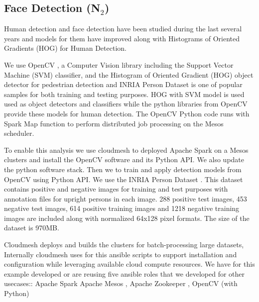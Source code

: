 \cite{flanagan2010nist}

\subsection{Face Detection (N$_2$)}


Human detection and face detection have been studied during the last
several years and models for them have improved along with Histograms
of Oriented Gradients (HOG) \cite{dalal2005histograms} for Human Detection. 



We use OpenCV \cite{bradski2000opencv}, a Computer Vision library including the
Support Vector Machine (SVM) classifier, and the Histogram of Oriented
Gradient (HOG) \cite{dalal2005histograms}object detector for pedestrian detection and
INRIA Person Dataset is one of popular samples for both training and
testing purposes. HOG with SVM model is used used as object detectors
and classifiers while the python libraries from OpenCV provide these
models for human detection.  The OpenCV Python code runs with Spark
Map function to perform distributed job processing on the Mesos
scheduler.

To enable this analysis we use cloudmesh to deployed Apache Spark on a
Mesos clusters and install the OpenCV software and its Python API. We
also update the python software stack. Then we to train and apply
detection models from OpenCV using Python API. We use the INRIA Person
Dataset \cite{dalal2005inria}. This dataset contains positive and negative images for
training and test purposes with annotation files for upright persons in each
image. 288 positive test images, 453 negative test images, 614 positive
training images and 1218 negative training images are included along with
normalized 64x128 pixel formats. The size of the dataset is 970MB.

Cloudmesh deploys and builds the clusters for batch-processing large
datasets, Internally cloudmesh uses for this ansible scripts to
support installation and configuration while leveraging available
cloud compute resources. We have for this example developed or are
reusing five ansible roles that we developed for other usecases::
Apache Spark \cite{ansible-role-spark}
Apache Mesos \cite{hindman2011mesos}, Apache Zookeeper
\cite{hunt2010zookeeper}, 
  OpenCV (with Python) \cite{ansible-role-opencv}



\cite{nist-facedetection}



